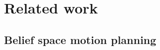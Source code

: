 \documentclass[Afour,sageh,times]{sagej}
\begin{document}
\section{Related work}






\subsection{Belief space motion planning}
\end{document}
